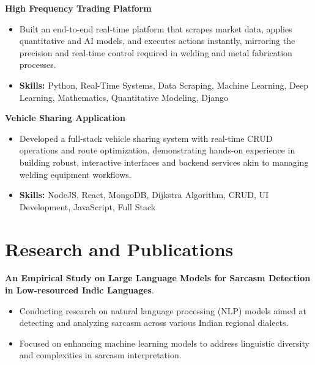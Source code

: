 \documentclass[a4paper,11pt]{article}
\begin{document}
\vspace{1mm}
  \textbf{High Frequency Trading Platform  }
\vspace{-1.5mm} %
\begin{itemize}
  \item Built an end-to-end real-time platform that scrapes market data, applies quantitative and AI models, and executes actions instantly, mirroring the precision and real-time control required in welding and metal fabrication processes.
\vspace{-3mm}
  \item \textbf{Skills:} Python, Real-Time Systems, Data Scraping, Machine Learning, Deep Learning, Mathematics, Quantitative Modeling, Django
\end{itemize}


\vspace{1mm}
   \textbf{Vehicle Sharing Application }
\vspace{-1.5mm} %
\begin{itemize}
  \item Developed a full-stack vehicle sharing system with real-time CRUD operations and route optimization, demonstrating hands-on experience in building robust, interactive interfaces and backend services akin to managing welding equipment workflows.
\vspace{-3mm}
  \item \textbf{Skills:} NodeJS, React, MongoDB, Dijkstra Algorithm, CRUD, UI Development, JavaScript, Full Stack
\end{itemize}



\section{\textbf{Research and Publications} \hfill }
\vspace{1mm}
  \textbf{An Empirical Study on Large Language Models for Sarcasm Detection in Low-resourced Indic Languages}.
\vspace{-1mm} %
\begin{itemize}
  \item Conducting research on natural language processing (NLP) models aimed at detecting and analyzing sarcasm across various Indian regional dialects.
\vspace{-3mm}
  \item Focused on enhancing machine learning models to address linguistic diversity and complexities in sarcasm interpretation.
\end{itemize}
\end{document}
